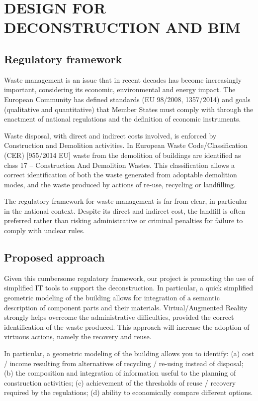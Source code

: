 \section{\uppercase{Design for Deconstruction and BIM}}
\label{sec:deconstruction}


\subsection{Regulatory framework}

Waste management is an issue that in recent decades has become increasingly important, considering its economic, environmental and energy  impact.
The European Community has defined standards (EU 98/2008, 1357/2014) and goals (qualitative and quantitative) that Member States must comply with through the enactment of national regulations and the definition of economic instruments.

Waste disposal, with direct and indirect costs involved, is enforced by Construction and Demolition activities. In European Waste Code/Classification (CER) [955/2014 EU] waste from the demolition of buildings are identified as class 17 -- Construction And Demolition Wastes. 
This classification allows a correct identification of both the waste generated from adoptable demolition modes, and the waste produced by actions of re-use, recycling or landfilling.
 
The regulatory framework for waste management is far from clear, in particular in the national context. Despite its direct and indirect cost, the landfill is often preferred rather than risking administrative or criminal penalties for failure to comply with unclear rules.  

\subsection{Proposed approach}

Given this cumbersome regulatory framework, our project is promoting the use of simplified IT tools to support the deconstruction. In particular, a quick simplified geometric modeling of the building allows for integration of a semantic description of component parts and their materials. Virtual/Augmented Reality  strongly helps overcome the administrative difficulties, provided the correct identification of the waste produced.
This approach will increase the adoption of virtuous actions, namely the recovery and reuse.

In particular, a  geometric modeling of the building allows you to identify:
(a) cost / income resulting from alternatives of recycling / re-using instead of disposal;
(b) the composition and integration of information useful to the planning of construction activities;
(c) achievement of the thresholds of reuse / recovery required by the regulations;
(d) ability to economically compare different options.




